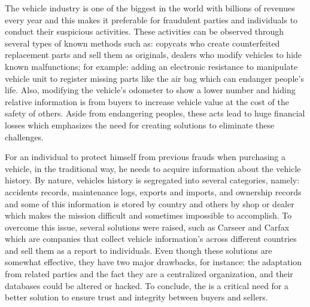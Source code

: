 The vehicle industry is one of the biggest in the world with billions of revenues every year and this makes it preferable for fraudulent
parties and individuals to conduct their suspicious activities. These activities can be observed through several types of known methods such
as: copycats who create counterfeited replacement parts and sell them as originals, dealers who modify vehicles to hide known malfunctions;
for example: adding an electronic resistance to manipulate vehicle unit to register missing parts like the air bag which can endanger
people's life. Also, modifying the vehicle’s odometer to show a lower number and hiding relative information is from buyers to increase
vehicle value at the cost of the safety of others. Aside from endangering peoples, these acts lead to huge financial losses which emphasizes
the need for creating solutions to eliminate these challenges.

For an individual to protect himself from previous frauds when purchasing a vehicle, in the traditional way, he needs to acquire information
about the vehicle history. By nature, vehicles history is segregated into several categories, namely: accidents records, maintenance logs,
exports and imports, and ownership records and some of this information is stored by country and others by shop or dealer which makes the
mission difficult and sometimes impossible to accomplish. To overcome this issue, several solutions were raised, such as Carseer and Carfax
which are companies that collect vehicle information's across different countries and sell them as a report to individuals. Even though
these solutions are somewhat effective, they have two major drawbacks, for instance: the adaptation from related parties and the fact they
are a centralized organization, and their databases could be altered or hacked. To conclude, the is a critical need for a better solution to
ensure trust and integrity between buyers and sellers.

